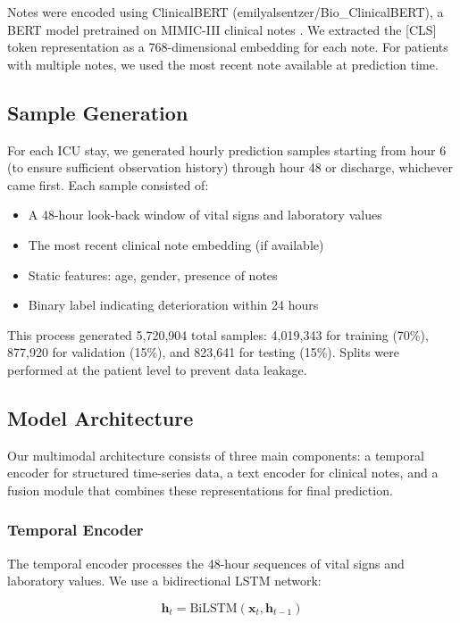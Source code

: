 Notes were encoded using ClinicalBERT (emilyalsentzer/Bio\_ClinicalBERT), a BERT model pretrained on MIMIC-III clinical notes \citep{Alsentzer2019}. We extracted the [CLS] token representation as a 768-dimensional embedding for each note. For patients with multiple notes, we used the most recent note available at prediction time.

\subsection{Sample Generation}

For each ICU stay, we generated hourly prediction samples starting from hour 6 (to ensure sufficient observation history) through hour 48 or discharge, whichever came first. Each sample consisted of:

\begin{itemize}
    \item A 48-hour look-back window of vital signs and laboratory values
    \item The most recent clinical note embedding (if available)
    \item Static features: age, gender, presence of notes
    \item Binary label indicating deterioration within 24 hours
\end{itemize}

This process generated 5,720,904 total samples: 4,019,343 for training (70\%), 877,920 for validation (15\%), and 823,641 for testing (15\%). Splits were performed at the patient level to prevent data leakage.

\subsection{Model Architecture}

Our multimodal architecture consists of three main components: a temporal encoder for structured time-series data, a text encoder for clinical notes, and a fusion module that combines these representations for final prediction.

\subsubsection{Temporal Encoder}

The temporal encoder processes the 48-hour sequences of vital signs and laboratory values. We use a bidirectional LSTM network:

\begin{equation}
\mathbf{h}_t = \text{BiLSTM}(\mathbf{x}_t, \mathbf{h}_{t-1})
\end{equation}

